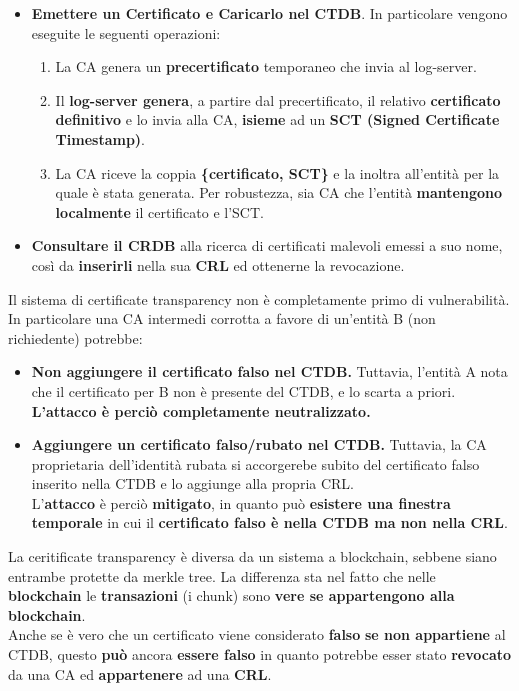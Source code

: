 \begin{proposition}
\begin{itemize}
    \item \textbf{Emettere un Certificato e Caricarlo nel CTDB}. In particolare vengono eseguite le seguenti operazioni:
    \begin{enumerate}
        \item La CA genera un \textbf{precertificato} temporaneo che invia al log-server.
        \item Il \textbf{log-server genera}, a partire dal precertificato, il relativo \textbf{certificato definitivo} e lo invia alla CA, \textbf{isieme} ad un \textbf{SCT (Signed Certificate Timestamp)}\footnotemark.
        \item La CA riceve la coppia \textbf{\{certificato, SCT\}} e la inoltra all'entità per la quale è stata generata. Per robustezza, sia CA che l'entità \textbf{mantengono localmente} il certificato e l'SCT.
    \end{enumerate}
    \item \textbf{Consultare il CRDB\footnotemark} alla ricerca di certificati malevoli emessi a suo nome, così da \textbf{inserirli} nella sua \textbf{CRL} ed ottenerne la revocazione.
\end{itemize}
\end{proposition}

Il sistema di certificate transparency non è completamente primo di vulnerabilità. In particolare una CA intermedi corrotta a favore di un'entità B (non richiedente) potrebbe:
\begin{itemize}
    \item \textbf{Non aggiungere il certificato falso nel CTDB.} Tuttavia, l’entità A nota che il certificato per B non è presente del CTDB, e lo scarta a priori. \textbf{ L’attacco è perciò completamente neutralizzato.}
\item \textbf{Aggiungere un certificato falso/rubato nel CTDB.} Tuttavia, la CA proprietaria dell’identità rubata si accorgerebe subito del certificato falso inserito nella CTDB e lo aggiunge alla propria CRL.\\
L’\textbf{attacco} è perciò \textbf{mitigato}, in quanto può \textbf{esistere una finestra temporale} in cui il \textbf{certificato falso è nella CTDB ma non nella CRL}.
\end{itemize}
\begin{note}
La ceritificate transparency è diversa da un sistema a blockchain, sebbene siano entrambe protette da merkle tree. La differenza sta nel fatto che nelle \textbf{blockchain} le \textbf{transazioni} (i chunk) sono \textbf{vere se appartengono alla blockchain}.\\
Anche se è vero che un certificato viene considerato \textbf{falso} \textbf{se non appartiene} al CTDB, questo \textbf{può} ancora \textbf{essere falso} in quanto potrebbe esser stato \textbf{revocato} da una CA ed \textbf{appartenere} ad una \textbf{CRL}.
\end{note}
\pagebreak
